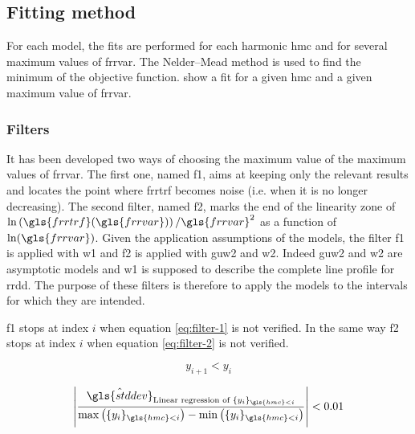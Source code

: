 \subsection{Fitting method}

For each model, the fits are performed for each harmonic \gls{hmc} and for several maximum values of \gls{frrvar}.
The Nelder–Mead method is used to find the minimum of the objective function.
 show a fit for a given \gls{hmc} and a given maximum value of \gls{frrvar}.


\subsubsection{Filters}\label{sec:filters}

It has been developed two ways of choosing the maximum value of the maximum values of \gls{frrvar}.
The first one, named \gls{f1}, aims at keeping only the relevant results and locates the point where \gls{frrtrf} becomes noise (i.e. when it is no longer decreasing).
The second filter, named \gls{f2}, marks the end of the linearity zone of \( \ln \left( \gls{frrtrf}(\gls{frrvar}) \right) / \gls{frrvar}^2 \) as a function of \( \ln(\gls{frrvar}) \).
Given the application assumptions of the models, the filter \gls{f1} is applied with \gls{w1} and \gls{f2} is applied with \gls{guw2} and \gls{w2}.
Indeed \gls{guw2} and \gls{w2} are asymptotic models and \gls{w1} is supposed to describe the complete line profile for \gls{rrdd}.
The purpose of these filters is therefore to apply the models to the intervals for which they are intended.

%
%

\bigskip

\gls{f1} stops at index \( i \) when equation \eqref{eq:filter-1} is not verified.
In the same way \gls{f2} stops at index \( i \) when equation \eqref{eq:filter-2} is not verified.

\begin{equation}\label{eq:filter-1}
y_{i+1} < y_i
\end{equation}

\begin{equation}\label{eq:filter-2}
\left| \frac{\hat{\gls{stddev}}_{\text{Linear regression of } \{ y_i \}_{\gls{hmc}<i}}}{\max \left( \{ y_i \}_{\gls{hmc}<i} \right) - \min \left( \{ y_i \}_{\gls{hmc}<i} \right)} \right| < 0.01
\end{equation}

